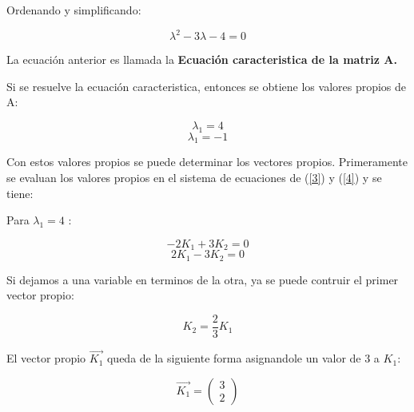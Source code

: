 \documentclass[titlepage]{article}
\begin{document}
      	  Ordenando y simplificando:
      	  
      	  \begin{equation*}      	  
      	  	\lambda^2 - 3\lambda - 4 = 0 	  	
      	  \end{equation*}
      	  
      	  La ecuación anterior es llamada la \textbf{Ecuación caracteristica de la matriz A.}
      	  
      	  Si se resuelve la ecuación caracteristica, entonces se obtiene los valores propios de A:
      	  
      	  \begin{equation*}
      	  	 \lambda_1 = 4
      	  \end{equation*}	
      	  \begin{equation*}
      	  	 \lambda_1 = -1
      	  \end{equation*}
      	  
      Con estos valores propios se puede determinar los vectores propios. Primeramente se evaluan los valores propios en el sistema de ecuaciones de (\ref{3}) y (\ref{4}) y se tiene:\par\vspace{0.2cm}
      
      	Para $\lambda_1 = 4 $ :
      	
      	\begin{equation*}
      			-2K_1 + 3K_2 = 0
      	\end{equation*}
      	\begin{equation*}
      			2K_1 - 3K_2 = 0
      	\end{equation*}
      	
      	Si dejamos a una variable en terminos de la otra, ya se puede contruir el primer vector propio:
      	
      	\begin{equation*}
      		K_2 = \frac{2}{3}K_1
      	\end{equation*}
      	
      	El vector propio $\vec{K_1}$ queda de la siguiente forma asignandole un valor de 3 a $K_1$:
      	
      		\begin{equation*}
      			\vec{K_1} = 
      			\begin{pmatrix}
      				3\\
      				2	
      			\end{pmatrix}
      		\end{equation*}
      	
\end{document}
